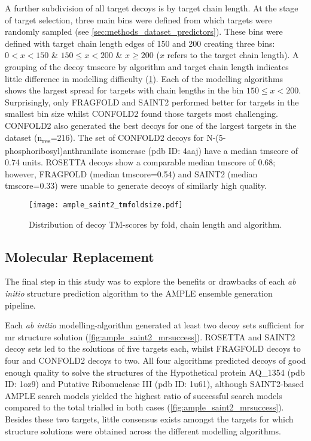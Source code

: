 A further subdivision of all target decoys is by target chain length. At the stage of target selection, three main bins were defined from which targets were randomly sampled (see \cref{sec:methods_dataset_predictors}). These bins were defined with target chain length edges of 150 and 200 creating three bins: $0 < x < 150$ \& $150 \leq x < 200$ \& $x \geq 200$ ($x$ refers to the target chain length). A grouping of the decoy \gls{tmscore} by algorithm and target chain length indicates little difference in modelling difficulty (\cref{fig:ample_saint2_tmfoldsize}). Each of the modelling algorithms shows the largest spread for targets with chain lengths in the bin $150 \leq x < 200$. Surprisingly, only FRAGFOLD and SAINT2 performed better for targets in the smallest bin size whilst CONFOLD2 found those targets most challenging. CONFOLD2 also generated the best decoys for one of the largest targets in the dataset (n\textsubscript{res}=216). The set of CONFOLD2 decoys for N-(5-phosphoribosyl)anthranilate isomerase (\gls{pdb} ID: 4aaj) have a median \gls{tmscore} of 0.74 units. ROSETTA decoys show a comparable median \gls{tmscore} of 0.68; however, FRAGFOLD (median \gls{tmscore}=0.54) and SAINT2 (median \gls{tmscore}=0.33) were unable to generate decoys of similarly high quality.

\begin{figure}[H]
    \centering
    \texttt{[image: ample\_saint2\_tmfoldsize.pdf]}
    \caption{Distribution of decoy TM-scores by fold, chain length and algorithm.}
    \label{fig:ample_saint2_tmfoldsize}
\end{figure}

\subsection{Molecular Replacement}
The final step in this study was to explore the benefits or drawbacks of each \textit{ab initio} structure prediction algorithm to the AMPLE ensemble generation pipeline.

Each \textit{ab initio} modelling-algorithm generated at least two decoy sets sufficient for \gls{mr} structure solution (\cref{fig:ample_saint2_mrsuccess}). ROSETTA and SAINT2 decoy sets led to the solutions of five targets each, whilst FRAGFOLD decoys to four and CONFOLD2 decoys to two. All four algorithms predicted decoys of good enough quality to solve the structures of the Hypothetical protein AQ\_1354 (\gls{pdb} ID: 1oz9) and Putative Ribonuclease III (\gls{pdb} ID: 1u61), although SAINT2-based AMPLE search models yielded the highest ratio of successful search models compared to the total trialled in both cases (\cref{fig:ample_saint2_mrsuccess}). Besides these two targets, little consensus exists amongst the targets for which structure solutions were obtained across the different modelling algorithms.

